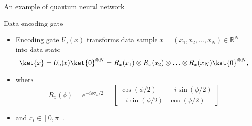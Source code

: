\begin{frame}{An example of quantum neural network}
\begin{block}{Data encoding gate}
\begin{itemize}
	\item Encoding gate $U_{\mathrm{e}}(x)$ 
	transforms data sample
	$x=(x_1, x_2, \ldots, x_N)\in \mathbb{R}^N$
	into data state
	$$\ket{x} = U_{\mathrm{e}}(x)\ket{0}^{\otimes N} = 
	R_x(x_1)\otimes R_x(x_2) \otimes \ldots \otimes R_x(x_N) 
	\ket{0}^{\otimes N},
	$$
	\item where 
	$$R_x(\phi) = e^{-i\phi\sigma_x/2} = 
	  \begin{bmatrix}
		\cos(\phi/2) & -i\sin(\phi/2) \\
		-i\sin(\phi/2) & \cos(\phi/2)
	\end{bmatrix}
	$$
	\item and $x_i\in[0,\pi]$.
\end{itemize}
\end{block}
\end{frame}

